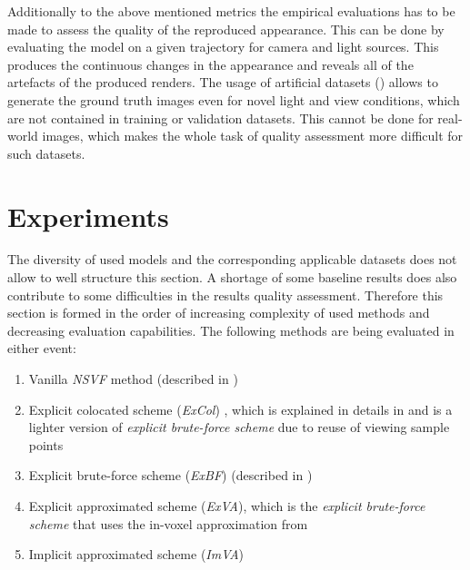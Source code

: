 Additionally to the above mentioned metrics the empirical evaluations has to be made
to assess the quality of the reproduced appearance.
This can be done by evaluating the model on a given trajectory for camera and light sources.
This produces the continuous changes in the appearance and reveals all of the artefacts of the produced renders.
The usage of artificial datasets () allows to generate the ground truth images
even for novel light and view conditions, which are not contained in training or validation datasets.
This cannot be done for real-world images, which makes the whole task of quality assessment more difficult for such datasets.


\section{Experiments}

The diversity of used models and the corresponding applicable datasets
does not allow to well structure this section.
A shortage of some baseline results does also contribute to some difficulties in the results quality assessment.
Therefore this section is formed in the order of increasing complexity of used methods and decreasing evaluation capabilities.
The following methods are being evaluated in either event:
\begin{enumerate}
    \item Vanilla \textit{NSVF} method \cite{liu2021neural} (described in )
    \item Explicit colocated scheme (\textit{ExCol}) \cite{bi2020neural, liu2021neural}, which is explained in details in 
    and is a lighter version of \textit{explicit brute-force scheme}
    due to reuse of viewing sample points
    \item Explicit brute-force scheme (\textit{ExBF}) (described in )
    \item Explicit approximated scheme (\textit{ExVA}), which is the \textit{explicit brute-force scheme}
    that uses the in-voxel approximation from 
    \item Implicit approximated scheme (\textit{ImVA}) 
\end{enumerate}




